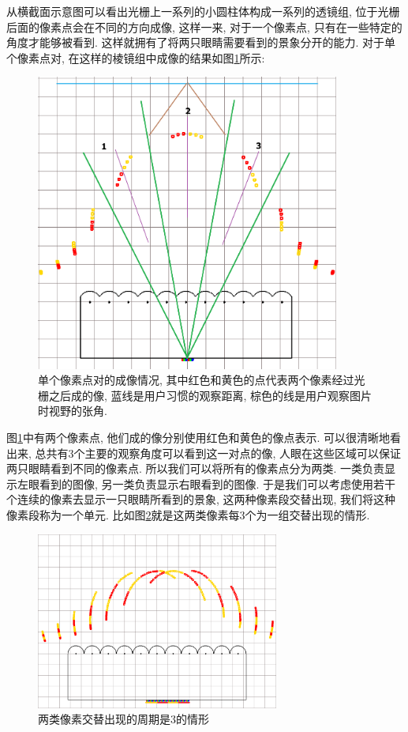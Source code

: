 \documentclass[a4paper, 11pt]{article}
\begin{document}
\begin{CJK}{UTF8}{gbsn}
从横截面示意图可以看出光栅上一系列的小圆柱体构成一系列的透镜组, 位于光栅后面的像素点会在不同的方向成像, 这样一来, 对于一个像素点, 只有在一些特定的角度才能够被看到. 这样就拥有了将两只眼睛需要看到的景象分开的能力. 对于单个像素点对, 在这样的棱镜组中成像的结果如图\ref{fig:217}所示:
\begin{figure}[h!]
  \centerline{\includegraphics[width=10cm]{217.png}}
  \caption{单个像素点对的成像情况, 其中红色和黄色的点代表两个像素经过光栅之后成的像, 蓝线是用户习惯的观察距离, 棕色的线是用户观察图片时视野的张角.}
  \label{fig:217}
\end{figure}

图\ref{fig:217}中有两个像素点, 他们成的像分别使用红色和黄色的像点表示. 可以很清晰地看出来, 总共有3个主要的观察角度可以看到这一对点的像, 人眼在这些区域可以保证两只眼睛看到不同的像素点. 所以我们可以将所有的像素点分为两类. 一类负责显示左眼看到的图像, 另一类负责显示右眼看到的图像. 于是我们可以考虑使用若干个连续的像素去显示一只眼睛所看到的景象, 这两种像素段交替出现, 我们将这种像素段称为一个单元. 比如图\ref{fig:223}就是这两类像素每3个为一组交替出现的情形.
\begin{figure}[h!]
  \centerline{\includegraphics[width=8cm]{223.png}}
  \caption{两类像素交替出现的周期是3的情形}
  \label{fig:223}
\end{figure}


\end{CJK}
\end{document}
